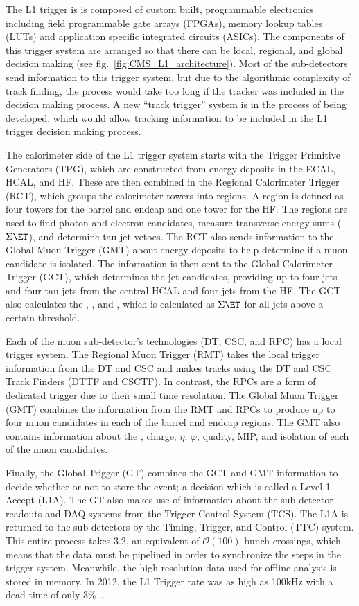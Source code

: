 The L1 trigger is is composed of custom built, programmable electronics including field programmable gate arrays (FPGAs), memory lookup tables (LUTs) and application specific integrated circuits (ASICs).
The components of this trigger system are arranged so that there can be local, regional, and global decision making (see fig.~\ref{fig:CMS_L1_architecture}).
Most of the sub-detectors send information to this trigger system, but due to the algorithmic complexity of track finding, the process would take too long if the tracker was included in the decision making process.
A new ``track trigger'' system is in the process of being developed, which would allow tracking information to be included in the L1 trigger decision making process.

The calorimeter side of the L1 trigger system starts with the Trigger Primitive Generators (TPG), which are constructed from energy deposits in the ECAL, HCAL, and HF.
These are then combined in the Regional Calorimeter Trigger (RCT), which groups the calorimeter towers into regions.
A region is defined as four towers for the barrel and endcap and one tower for the HF.
The regions are used to find photon and electron candidates, measure transverse energy sums ($\Sigma\ET$), and determine tau-jet vetoes.
The RCT also sends information to the Global Muon Trigger (GMT) about energy deposits to help determine if a muon candidate is isolated.
The information is then sent to the Global Calorimeter Trigger (GCT), which determines the jet candidates, providing up to four jets and four tau-jets from the central HCAL and four jets from the HF.
The GCT also calculates the \ET, \ETslash, and \HT, which is calculated as $\Sigma\ET$ for all jets above a certain threshold.

Each of the muon sub-detector's technologies (DT, CSC, and RPC) has a local trigger system.
The Regional Muon Trigger (RMT) takes the local trigger information from the DT and CSC and makes tracks using the DT and CSC Track Finders (DTTF and CSCTF).
In contrast, the RPCs are a form of dedicated trigger due to their small time resolution.
The Global Muon Trigger (GMT) combines the information from the RMT and RPCs to produce up to four muon candidates in each of the barrel and endcap regions.
The GMT also contains information about the \pt, charge, $\eta$, $\varphi$, quality, MIP, and isolation of each of the muon candidates.

Finally, the Global Trigger (GT) combines the GCT and GMT information to decide whether or not to store the event; a decision which is called a Level-1 Accept (L1A).
The GT also makes use of information about the sub-detector readouts and DAQ systems from the Trigger Control System (TCS). The L1A is returned to the sub-detectors by the Timing, Trigger, and Control (TTC) system.
This entire process takes 3.2\mus, an equivalent of $\mathcal{O}(100)$ bunch crossings, which means that the data must be pipelined in order to synchronize the steps in the trigger system.
Meanwhile, the high resolution data used for offline analysis is stored in memory. In 2012, the L1 Trigger rate was as high as 100\unit{kHz} with a dead time of only 3\%~\cite{Brooke:2013hnf}.

